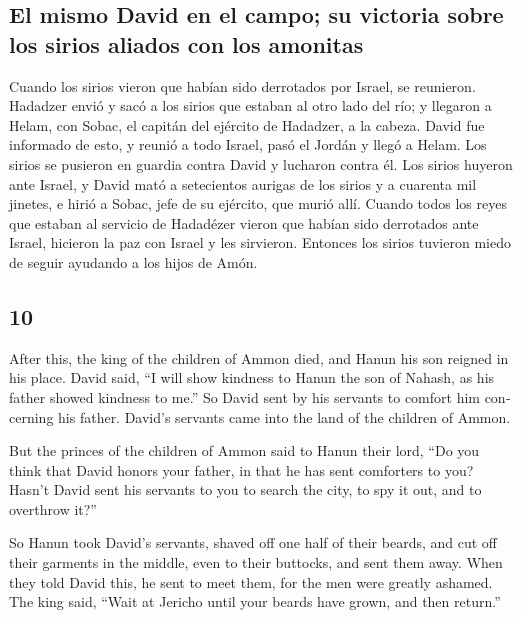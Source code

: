 \begin{paracol}{2}
\hypertarget{el-mismo-david-en-el-campo-su-victoria-sobre-los-sirios-aliados-con-los-amonitas}{%
\subsection{El mismo David en el campo; su victoria sobre los sirios
aliados con los
amonitas}\label{el-mismo-david-en-el-campo-su-victoria-sobre-los-sirios-aliados-con-los-amonitas}}

 Cuando los sirios vieron que habían sido derrotados por
Israel, se reunieron.  Hadadzer envió y sacó a los sirios
que estaban al otro lado del río; y llegaron a Helam, con Sobac, el
capitán del ejército de Hadadzer, a la cabeza.  David fue
informado de esto, y reunió a todo Israel, pasó el Jordán y llegó a
Helam. Los sirios se pusieron en guardia contra David y lucharon contra
él.  Los sirios huyeron ante Israel, y David mató a
setecientos aurigas de los sirios y a cuarenta mil jinetes, e hirió a
Sobac, jefe de su ejército, que murió allí.  Cuando todos
los reyes que estaban al servicio de Hadadézer vieron que habían sido
derrotados ante Israel, hicieron la paz con Israel y les sirvieron.
Entonces los sirios tuvieron miedo de seguir ayudando a los hijos de
Amón.

\switchcolumn
\begin{otherlanguage}{english}

\hypertarget{section-19}{%
\section{10}\label{section-19}}

 After this, the king of the children of Ammon died, and
Hanun his son reigned in his place.  David said, ``I will
show kindness to Hanun the son of Nahash, as his father showed kindness
to me.'' So David sent by his servants to comfort him concerning his
father. David's servants came into the land of the children of Ammon.

 But the princes of the children of Ammon said to Hanun
their lord, ``Do you think that David honors your father, in that he has
sent comforters to you? Hasn't David sent his servants to you to search
the city, to spy it out, and to overthrow it?''

 So Hanun took David's servants, shaved off one half of
their beards, and cut off their garments in the middle, even to their
buttocks, and sent them away.  When they told David this,
he sent to meet them, for the men were greatly ashamed. The king said,
``Wait at Jericho until your beards have grown, and then return.''


\end{otherlanguage}
\end{paracol}
